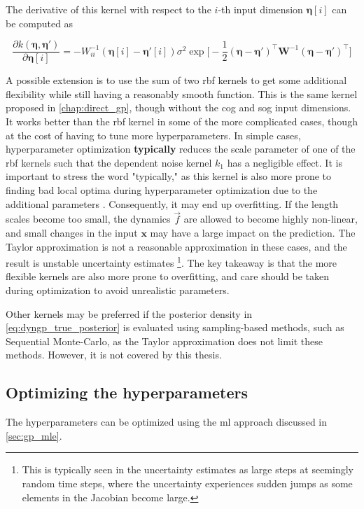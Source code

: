 The derivative of this kernel with respect to the $i$-th input dimension $\boldsymbol{\eta}[i]$ can be computed as \cite{pedestrian, gpekf}

\begin{equation}
    \frac{\partial k(\boldsymbol{\eta}, \boldsymbol{\eta}')}{\partial \boldsymbol{\eta}[i]} = -W_{ii}^{-1}(\boldsymbol{\eta}[i] - \boldsymbol{\eta}'[i]) \sigma^2 \exp \big[ - \frac{1}{2} (\boldsymbol{\eta} - \boldsymbol{\eta}')^\intercal \boldsymbol{W}^{-1} (\boldsymbol{\eta} - \boldsymbol{\eta}')^\intercal\big]
\end{equation}


A possible extension is to use the sum of two \acrshort{rbf} kernels to get some additional flexibility while still having a reasonably smooth function. This is the same kernel proposed in \cref{chap:direct_gp}, though without the \acrshort{cog} and \acrshort{sog} input dimensions. It works better than the \acrshort{rbf} kernel in some of the more complicated cases, though at the cost of having to tune more hyperparameters. In simple cases, hyperparameter optimization \textbf{typically} reduces the scale parameter of one of the \acrshort{rbf} kernels such that the dependent noise kernel $k_1$ has a negligible effect. It is important to stress the word "typically," as this kernel is also more prone to finding bad local optima during hyperparameter optimization due to the additional parameters \cite{rasmussen}. Consequently, it may end up overfitting. If the length scales become too small, the dynamics $\vec{f}$ are allowed to become highly non-linear, and small changes in the input $\boldsymbol{x}$ may have a large impact on the prediction. The Taylor approximation is not a reasonable approximation in these cases, and the result is unstable uncertainty estimates \footnote{This is typically seen in the uncertainty estimates as large steps at seemingly random time steps, where the uncertainty experiences sudden jumps as some elements in the Jacobian become large.}. The key takeaway is that the more flexible kernels are also more prone to overfitting, and care should be taken during optimization to avoid unrealistic parameters.

Other kernels may be preferred if the posterior density in \cref{eq:dyngp_true_posterior} is evaluated using sampling-based methods, such as Sequential Monte-Carlo, as the Taylor approximation does not limit these methods.  However, it is not covered by this thesis.


\subsection{Optimizing the hyperparameters}
The hyperparameters can be optimized using the \acrshort{ml} approach discussed in \cref{sec:gp_mle}.

